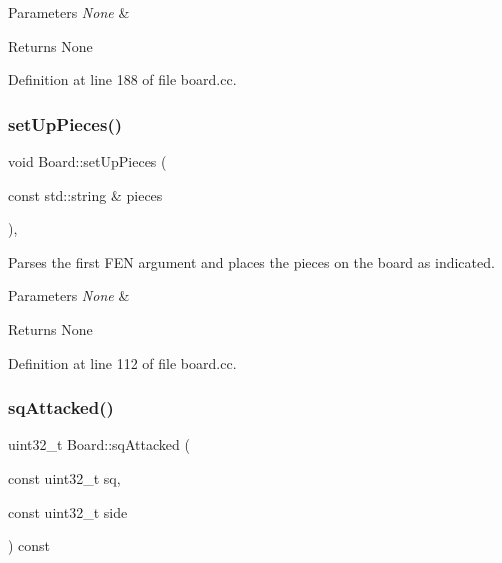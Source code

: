 \begin{DoxyParams}{Parameters}
{\em None} & \\
\hline
\end{DoxyParams}
\begin{DoxyReturn}{Returns}
None 
\end{DoxyReturn}


Definition at line 188 of file board.\+cc.

\mbox{\label{classBoard_a097a5d64cd3772c539f7ce6dda9a929a}} 
\subsubsection{\texorpdfstring{set\+Up\+Pieces()}{setUpPieces()}}
{\footnotesize\ttfamily void Board\+::set\+Up\+Pieces (\begin{DoxyParamCaption}\item[{const std\+::string \&}]{pieces }\end{DoxyParamCaption})\hspace{0.3cm}{\ttfamily [private]}, {\ttfamily [noexcept]}}



Parses the first F\+EN argument and places the pieces on the board as indicated. 


\begin{DoxyParams}{Parameters}
{\em None} & \\
\hline
\end{DoxyParams}
\begin{DoxyReturn}{Returns}
None 
\end{DoxyReturn}


Definition at line 112 of file board.\+cc.

\mbox{\label{classBoard_aeb6553a6d78975ad65261542ba8989e4}} 
\subsubsection{\texorpdfstring{sq\+Attacked()}{sqAttacked()}}
{\footnotesize\ttfamily uint32\+\_\+t Board\+::sq\+Attacked (\begin{DoxyParamCaption}\item[{const uint32\+\_\+t}]{sq,  }\item[{const uint32\+\_\+t}]{side }\end{DoxyParamCaption}) const\hspace{0.3cm}{\ttfamily [noexcept]}}




